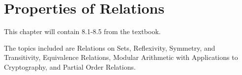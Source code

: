 \documentclass[../discrete.tex]{subfiles}
\begin{document}
\chapter{Properties of Relations}
This chapter will contain 8.1-8.5 from the textbook.

The topics included are Relations on Sets, Reflexivity, Symmetry, and Transitivity, Equivalence Relations, Modular Arithmetic with Applications to Cryptography, and Partial Order Relations.
\end{document}
